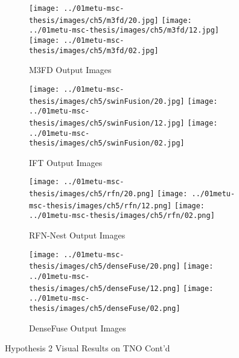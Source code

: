 \begin{figure}[htbp]
    \centering
    \begin{subfigure}[b]{\textwidth}
        \texttt{[image: ../01metu-msc-thesis/images/ch5/m3fd/20.jpg]}
        \texttt{[image: ../01metu-msc-thesis/images/ch5/m3fd/12.jpg]}
        \texttt{[image: ../01metu-msc-thesis/images/ch5/m3fd/02.jpg]}
        \caption{M3FD\cite{liu2022target} Output Images}
        \label{fig:ch5:met9:m3fd}
    \end{subfigure}
    \vspace{0.01cm}
    \begin{subfigure}[b]{\textwidth}
        \texttt{[image: ../01metu-msc-thesis/images/ch5/swinFusion/20.jpg]}
        \texttt{[image: ../01metu-msc-thesis/images/ch5/swinFusion/12.jpg]}
        \texttt{[image: ../01metu-msc-thesis/images/ch5/swinFusion/02.jpg]}
        \caption{IFT\cite{vs2022image} Output Images}
        \label{fig:ch5:met9:ift}
    \end{subfigure}
    \vspace{0.01cm}
    \begin{subfigure}[b]{\textwidth}
        \texttt{[image: ../01metu-msc-thesis/images/ch5/rfn/20.png]}
        \texttt{[image: ../01metu-msc-thesis/images/ch5/rfn/12.png]}
        \texttt{[image: ../01metu-msc-thesis/images/ch5/rfn/02.png]}
        \caption{RFN-Nest\cite{li2021rfn} Output Images}
        \label{fig:ch5:met9:rfn}
    \end{subfigure}
    \vspace{0.01cm}
    \begin{subfigure}[b]{\textwidth}
        \texttt{[image: ../01metu-msc-thesis/images/ch5/denseFuse/20.png]}
        \texttt{[image: ../01metu-msc-thesis/images/ch5/denseFuse/12.png]}
        \texttt{[image: ../01metu-msc-thesis/images/ch5/denseFuse/02.png]}
        \caption{DenseFuse\cite{li2019infrared} Output Images}
        \label{fig:ch5:met9:densefuse}
    \end{subfigure}
    \caption{Hypothesis 2 Visual Results on TNO Cont'd}
\end{figure}

